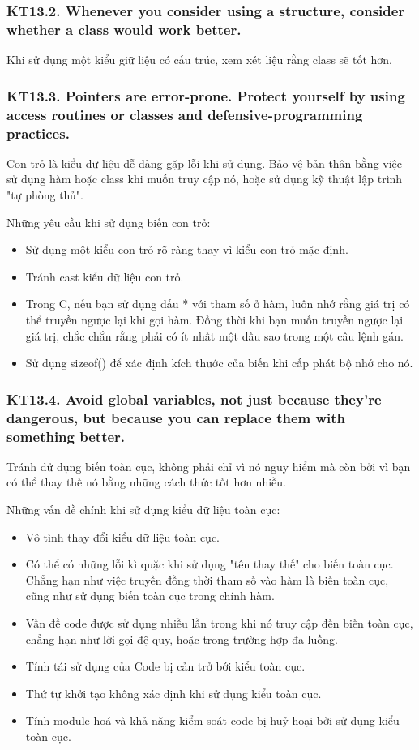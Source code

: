 \documentclass[12pt]{report}
\begin{document}
\subsubsection{KT13.2. Whenever you consider using a structure, consider whether a class would work better.}
Khi sử dụng một kiểu giữ liệu có cấu trúc, xem xét liệu rằng class sẽ tốt hơn.


 
\subsubsection{KT13.3. Pointers are error-prone. Protect yourself by using access routines or classes and defensive-programming practices.}
Con trỏ là kiểu dữ liệu dễ dàng gặp lỗi khi sử dụng. Bảo vệ bản thân bằng việc sử dụng hàm hoặc class khi muốn truy cập nó, hoặc sử dụng kỹ thuật lập trình "tự phòng thủ".
\vspace*{5mm}

\noindent Những yêu cầu khi sử dụng biến con trỏ:
\begin{itemize}
	\item Sử dụng một kiểu con trỏ rõ ràng thay vì kiểu con trỏ mặc định. 
	\item Tránh cast kiểu dữ liệu con trỏ.
	\item Trong C, nếu bạn sử dụng dấu * với tham số ở hàm, luôn nhớ rằng giá trị có thể truyền ngược lại khi gọi hàm. Đồng thời khi bạn muốn truyền ngược lại giá trị, chắc chắn rằng phải có ít nhất một dấu sao trong một câu lệnh gán. 
	\item Sử dụng sizeof() để xác định kích thước của biến khi cấp phát bộ nhớ cho nó. 
\end{itemize}

\subsubsection{KT13.4. Avoid global variables, not just because they're dangerous, but because you can replace them with something better.}
Tránh dử dụng biến toàn cục, không phải chỉ vì nó nguy hiểm mà còn bởi vì bạn có thể thay thế nó bằng những cách thức tốt hơn nhiều. 
\vspace*{5mm}

\noindent Những vấn đề chính khi sử dụng kiểu dữ liệu toàn cục: 
\begin{itemize}
	\item Vô tình thay đổi kiểu dữ liệu toàn cục.
	\item Có thể có những lỗi kì quặc khi sử dụng "tên thay thế" cho biến toàn cục. Chẳng hạn như việc truyền đồng thời tham số vào hàm là biến toàn cục, cũng như sử dụng biến toàn cục trong chính hàm. 
	\item Vấn đề code được sử dụng nhiều lần trong khi nó truy cập đến biến toàn cục, chẳng hạn như lời gọi đệ quy, hoặc trong trường hợp đa luồng. 
	\item Tính tái sử dụng của Code bị cản trở bới kiểu toàn cục. 
	\item Thứ tự khởi tạo không xác định khi sử dụng kiểu toàn cục. 
	\item Tính module hoá và khả năng kiểm soát code bị huỷ hoại bởi sử dụng kiểu toàn cục. 	
\end{itemize}
\end{document}
